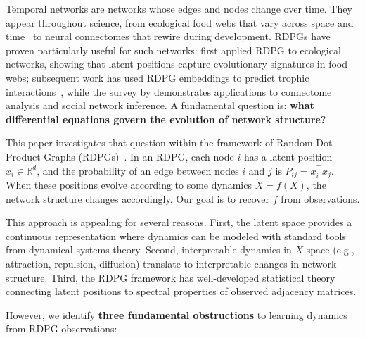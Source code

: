 \documentclass{article}
\newcommand{\RR}{\mathbb{R}}
\theoremstyle{plain}
\theoremstyle{definition}
\theoremstyle{remark}
\begin{document}
Temporal networks are networks whose edges and nodes change over time. They appear throughout science, from ecological food webs that vary across space and time~\citep{poisot2015species} to neural connectomes that rewire during development.
RDPGs have proven particularly useful for such networks: \citet{dallariva2016exploring} first applied RDPG to ecological networks, showing that latent positions capture evolutionary signatures in food webs; subsequent work has used RDPG embeddings to predict trophic interactions~\citep{strydom2022food}, while the survey by \citet{athreya2017statistical} demonstrates applications to connectome analysis and social network inference.
A fundamental question is: \textbf{what differential equations govern the evolution of network structure?}

This paper investigates that question within the framework of Random Dot Product Graphs (RDPGs)~\citep{athreya2017statistical,young2007random}.
In an RDPG, each node $i$ has a latent position $x_i \in \RR^d$, and the probability of an edge between nodes $i$ and $j$ is $P_{ij} = x_i^\top x_j$.
When these positions evolve according to some dynamics $\dot{X} = f(X)$, the network structure changes accordingly.
Our goal is to recover $f$ from observations.

This approach is appealing for several reasons.
First, the latent space provides a continuous representation where dynamics can be modeled with standard tools from dynamical systems theory.
Second, interpretable dynamics in $X$-space (e.g., attraction, repulsion, diffusion) translate to interpretable changes in network structure.
Third, the RDPG framework has well-developed statistical theory connecting latent positions to spectral properties of observed adjacency matrices.

However, we identify \textbf{three fundamental obstructions} to learning dynamics from RDPG observations:
\end{document}

